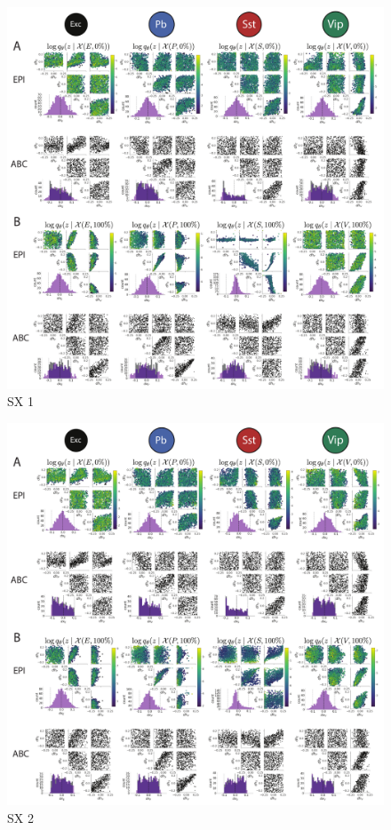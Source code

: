 \documentclass[11pt]{article}
\begin{document}
\begin{figure}[h]
\caption{\small SX 1
 }\label{fig:SX1}
\begin{center}
\includegraphics[scale=.5]{figs/FigSX/Fig_SX1.pdf}
\end{center}
\end{figure}

\begin{figure}[h]
\caption{\small SX 2
 }\label{fig:SX2}
\begin{center}
\includegraphics[scale=.5]{figs/FigSX/Fig_SX2.pdf}
\end{center}
\end{figure}
\end{document}
